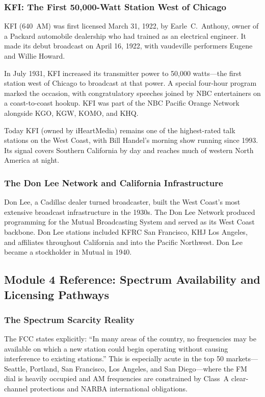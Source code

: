 \documentclass[11pt,letterpaper]{article}
\begin{document}
\begin{asciibox}
\subsubsection{KFI: The First 50,000-Watt Station West of Chicago}

KFI (640~AM) was first licensed March 31, 1922, by Earle~C.~Anthony, owner of a Packard
automobile dealership who had trained as an electrical engineer. It made its debut broadcast
on April 16, 1922, with vaudeville performers Eugene and Willie Howard.

In July 1931, KFI increased its transmitter power to 50,000 watts---the first station west of
Chicago to broadcast at that power. A special four-hour program marked the occasion, with
congratulatory speeches joined by NBC entertainers on a coast-to-coast hookup. KFI was part
of the NBC Pacific Orange Network alongside KGO, KGW, KOMO, and KHQ.

Today KFI (owned by iHeartMedia) remains one of the highest-rated talk stations on the West
Coast, with Bill Handel's morning show running since 1993. Its signal covers Southern California
by day and reaches much of western North America at night.

\subsubsection{The Don Lee Network and California Infrastructure}

Don Lee, a Cadillac dealer turned broadcaster, built the West Coast's most extensive broadcast
infrastructure in the 1930s. The Don Lee Network produced programming for the Mutual Broadcasting
System and served as its West Coast backbone. Don Lee stations included KFRC San Francisco,
KHJ Los Angeles, and affiliates throughout California and into the Pacific Northwest. Don Lee
became a stockholder in Mutual in 1940.

\subsection{Module 4 Reference: Spectrum Availability and Licensing Pathways}

\subsubsection{The Spectrum Scarcity Reality}

The FCC states explicitly: ``In many areas of the country, no frequencies may be available on
which a new station could begin operating without causing interference to existing stations.''
This is especially acute in the top 50 markets---Seattle, Portland, San Francisco, Los Angeles,
and San Diego---where the FM dial is heavily occupied and AM frequencies are constrained by
Class~A clear-channel protections and NARBA international obligations.


\end{asciibox}
\end{document}
